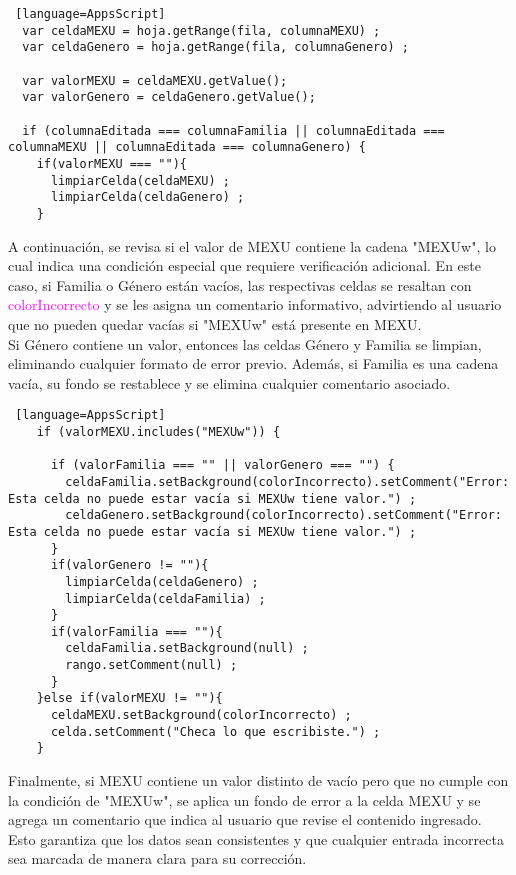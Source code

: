 \documentclass[12pt]{article} %
\begin{document}
    \begin{lstlisting} [language=AppsScript]
  var celdaMEXU = hoja.getRange(fila, columnaMEXU) ;
  var celdaGenero = hoja.getRange(fila, columnaGenero) ;

  var valorMEXU = celdaMEXU.getValue();
  var valorGenero = celdaGenero.getValue();

  if (columnaEditada === columnaFamilia || columnaEditada === columnaMEXU || columnaEditada === columnaGenero) {
    if(valorMEXU === ""){
      limpiarCelda(celdaMEXU) ;
      limpiarCelda(celdaGenero) ;
    }

    \end{lstlisting}
    A continuación, se revisa si el valor de MEXU contiene la cadena "MEXUw", lo cual indica una condición especial que requiere verificación adicional. En este caso, si Familia o Género están vacíos, las respectivas celdas se resaltan con \textcolor{magenta}{colorIncorrecto} y se les asigna un comentario informativo, advirtiendo al usuario que no pueden quedar vacías si "MEXUw" está presente en MEXU. \\
    
    Si Género contiene un valor, entonces las celdas Género y Familia se limpian, eliminando cualquier formato de error previo. Además, si Familia es una cadena vacía, su fondo se restablece y se elimina cualquier comentario asociado.

    \begin{lstlisting} [language=AppsScript]
    if (valorMEXU.includes("MEXUw")) {
    
      if (valorFamilia === "" || valorGenero === "") {
        celdaFamilia.setBackground(colorIncorrecto).setComment("Error: Esta celda no puede estar vacía si MEXUw tiene valor.") ;
        celdaGenero.setBackground(colorIncorrecto).setComment("Error: Esta celda no puede estar vacía si MEXUw tiene valor.") ;
      } 
      if(valorGenero != ""){
        limpiarCelda(celdaGenero) ;
        limpiarCelda(celdaFamilia) ;
      }
      if(valorFamilia === ""){
        celdaFamilia.setBackground(null) ;
        rango.setComment(null) ;
      }
    }else if(valorMEXU != ""){
      celdaMEXU.setBackground(colorIncorrecto) ;
      celda.setComment("Checa lo que escribiste.") ; 
    }
      \end{lstlisting}
    
    Finalmente, si MEXU contiene un valor distinto de vacío pero que no cumple con la condición de "MEXUw", se aplica un fondo de error a la celda MEXU y se agrega un comentario que indica al usuario que revise el contenido ingresado. Esto garantiza que los datos sean consistentes y que cualquier entrada incorrecta sea marcada de manera clara para su corrección.
\end{document}
